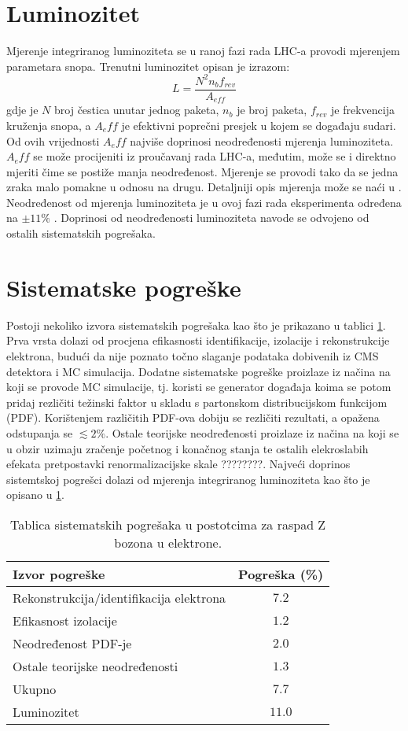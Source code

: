 \documentclass[a4paper,12pt]{report}
\begin{document}
\section{Luminozitet}
\label{sec:luminozitet}
Mjerenje integriranog luminoziteta se u ranoj fazi rada LHC-a provodi mjerenjem parametara snopa. Trenutni luminozitet opisan je izrazom:
\begin{equation}
 L= \frac{N^2 n_b f_{rev}}{A_{eff}}
\end{equation}
gdje je $N$ broj čestica unutar jednog paketa, $n_b$ je broj paketa, $f_{rev}$ je frekvencija kruženja snopa, a $A_eff$ je efektivni poprečni presjek u kojem se događaju sudari. Od ovih vrijednosti $A_eff$ najviše doprinosi neodređenosti mjerenja luminoziteta. $A_eff$ se može procijeniti iz proučavanj rada LHC-a, međutim, može se i direktno mjeriti čime se postiže manja neodređenost.  Mjerenje se provodi tako da se jedna zraka malo pomakne u odnosu na drugu. Detaljniji opis mjerenja može se naći u \cite{luminosity}.\\
Neodređenost od mjerenja luminoziteta je u ovoj fazi rada eksperimenta određena na $\pm 11\%$ \cite{lumpas}. Doprinosi od neodređenosti luminoziteta navode se odvojeno od ostalih sistematskih pogrešaka. 

\section{Sistematske pogreške}
Postoji nekoliko izvora sistematskih pogrešaka kao što je prikazano u tablici \ref{tab:sisterr}. Prva vrsta dolazi od procjena efikasnosti identifikacije, izolacije i rekonstrukcije elektrona, budući da nije poznato točno slaganje podataka dobivenih iz CMS detektora i MC simulacija. Dodatne sistematske pogreške proizlaze iz načina na koji se provode MC simulacije, tj. koristi se generator događaja koima se potom pridaj rezličiti težinski faktor u skladu s partonskom distribucijskom funkcijom (PDF). Korištenjem različitih PDF-ova dobiju se rezličiti rezultati, a opažena odstupanja se $\lesssim 2\%$. Ostale teorijske neodređenosti proizlaze iz načina na koji se u obzir uzimaju zračenje početnog i konačnog stanja te ostalih elekroslabih efekata pretpostavki renormalizacijske skale ????????. \cite{pas}
Najveći doprinos sistemtskoj pogrešci dolazi od mjerenja integriranog luminoziteta kao što je opisano u \ref{sec:luminozitet}.
\begin{table}[h!]
 \centering
\begin{tabular}{l c}
  \hline
  \hline
Izvor pogreške & Pogreška (\%) \\
\hline
Rekonstrukcija/identifikacija elektrona & $7.2$ \\
Efikasnost izolacije &  $1.2$ \\
Neodređenost PDF-je & $2.0$ \\
Ostale teorijske neodređenosti & $1.3$ \\
\hline
Ukupno & $7.7$ \\
\hline
Luminozitet & $11.0$ \\
\hline
\hline
\end{tabular}
\caption{Tablica sistematskih pogrešaka u postotcima za raspad Z bozona u elektrone.\cite{pas}}
\label{tab:sisterr}
\end{table}
\end{document}
